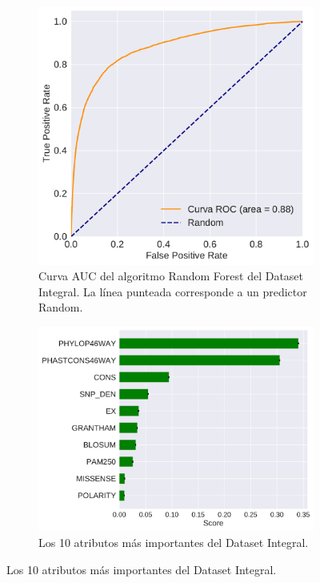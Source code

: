 \newpage

\begin{figure}[H]
\centering
\begin{subfigure}[b]{0.8\textwidth}
    \centering
    \includegraphics[width=\textwidth]{documents/latex/figures/3/integral/auc_integral.pdf}
    \caption{Curva AUC del algoritmo Random Forest del Dataset Integral. La línea punteada corresponde a un predictor Random.}
    \label{fig:auc_integral}
\end{subfigure}
\hfill
\hfill
\begin{subfigure}[b]{0.9\textwidth}
    \centering
    \includegraphics[width=\textwidth]{documents/latex/figures/3/integral/importances_integral.pdf}
    \caption{Los 10 atributos más importantes del Dataset Integral.}
    \label{fig:importances_integral}
\end{subfigure}
\end{figure}






